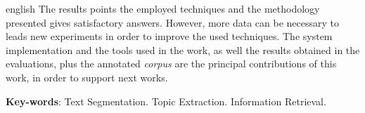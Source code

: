 \begin{resumo}[Abstract]
\begin{otherlanguage*}{english}
The results points the employed techniques and the methodology presented gives satisfactory answers. However, more data can be necessary to leads new experiments in order to improve the used techniques.  
The system implementation and the tools used in the work, as well the results obtained in the evaluations, plus the annotated \textit{corpus} are the principal contributions of this work, in order to support next works.








\textbf{Key-words}: 
Text Segmentation.
Topic Extraction.
Information Retrieval.

 \end{otherlanguage*}
\end{resumo}
